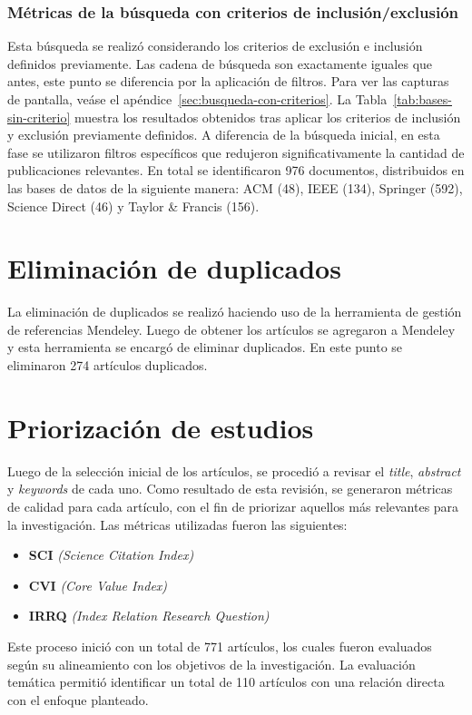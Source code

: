 \subsubsection{Métricas de la búsqueda con criterios de inclusión/exclusión}\label{subsec:resumenBusquedaCriterios}
\noindent
Esta búsqueda se realizó considerando los criterios de exclusión e inclusión definidos previamente. Las cadena de búsqueda son exactamente iguales que antes, este punto se diferencia por la aplicación de filtros. Para ver las capturas de pantalla, veáse el apéndice~\ref{sec:busqueda-con-criterios}.
La Tabla~\ref{tab:bases-sin-criterio} muestra los resultados obtenidos tras aplicar los criterios de inclusión y exclusión previamente definidos. A diferencia de la búsqueda inicial, en esta fase se utilizaron filtros específicos que redujeron significativamente la cantidad de publicaciones relevantes. En total se identificaron 976 documentos, distribuidos en las bases de datos de la siguiente manera: ACM (48), IEEE (134), Springer (592), Science Direct (46) y Taylor \& Francis (156).




\section{Eliminación de duplicados}\label{sec:eliminacionDuplicados}
\noindent
La eliminación de duplicados se realizó haciendo uso de la herramienta de gestión de referencias Mendeley. Luego de obtener los artículos se agregaron a Mendeley y esta herramienta se encargó de eliminar duplicados. En este punto se eliminaron 274 artículos duplicados.

\section{Priorización de estudios}\label{sec:priorizacionEstudios}
\noindent
Luego de la selección inicial de los artículos, se procedió a revisar el \textit{title}, \textit{abstract} y \textit{keywords} de cada uno. Como resultado de esta revisión, se generaron métricas de calidad para cada artículo, con el fin de priorizar aquellos más relevantes para la investigación. Las métricas utilizadas fueron las siguientes:

\begin{itemize}
    \item \textbf{SCI} \textit{(Science Citation Index)}
    \item \textbf{CVI} \textit{(Core Value Index)}
    \item \textbf{IRRQ} \textit{(Index Relation Research Question)}
\end{itemize}
\noindent
Este proceso inició con un total de 771 artículos, los cuales fueron evaluados según su alineamiento con los objetivos de la investigación. La evaluación temática permitió identificar un total de 110 artículos con una relación directa con el enfoque planteado.

